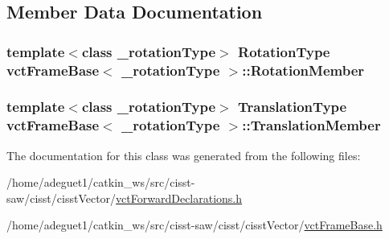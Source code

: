 \subsection{Member Data Documentation}
\hypertarget{classvct_frame_base_a686087937bca6d58cbfaf251736915b4}{
\subsubsection[{Rotation\-Member}]{\setlength{\rightskip}{0pt plus 5cm}template$<$class \-\_\-rotation\-Type$>$ {\bf Rotation\-Type} {\bf vct\-Frame\-Base}$<$ \-\_\-rotation\-Type $>$\-::Rotation\-Member\hspace{0.3cm}{\ttfamily [protected]}}}\label{classvct_frame_base_a686087937bca6d58cbfaf251736915b4}
\hypertarget{classvct_frame_base_a982d51cac7f38f898989db9f8ad3ff84}{
\subsubsection[{Translation\-Member}]{\setlength{\rightskip}{0pt plus 5cm}template$<$class \-\_\-rotation\-Type$>$ {\bf Translation\-Type} {\bf vct\-Frame\-Base}$<$ \-\_\-rotation\-Type $>$\-::Translation\-Member\hspace{0.3cm}{\ttfamily [protected]}}}\label{classvct_frame_base_a982d51cac7f38f898989db9f8ad3ff84}


The documentation for this class was generated from the following files\-:\begin{DoxyCompactItemize}
\item 
/home/adeguet1/catkin\-\_\-ws/src/cisst-\/saw/cisst/cisst\-Vector/\hyperlink{vct_forward_declarations_8h}{vct\-Forward\-Declarations.\-h}\item 
/home/adeguet1/catkin\-\_\-ws/src/cisst-\/saw/cisst/cisst\-Vector/\hyperlink{vct_frame_base_8h}{vct\-Frame\-Base.\-h}\end{DoxyCompactItemize}
